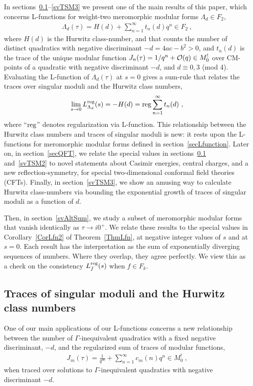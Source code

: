 \documentclass[11pt,a4paper]{article}
\newcommand{\G}{\Gamma}
\newcommand{\reg}{{\rm reg}}
\begin{document}
In sections~\ref{svTSM1}--\ref{svTSM3} we present one of the main results of this paper, which concerns L-functions for weight-two meromorphic modular forms $\Lambda_d \in F_2$,
\begin{align}
\Lambda_d(\tau) = H(d) + \sum_{n = 1}^{\infty} t_n(d) q^n \in F_2~, \label{s3e1}
\end{align}
where $H(d)$ is the Hurwitz class-number, and that counts the number of distinct quadratics with negative discriminant $-d = 4ac - b^2 > 0$, and $t_n(d)$ is the trace of the unique modular function $J_n(\tau) = 1/q^n + {\cal O}(q) \in M_0^{!}$ over CM-points of a quadratic with negative discriminant $-d$, and $d \equiv 0, 3$ (mod 4). Evaluating the L-function of $\Lambda_d(\tau)$ at $s = 0$ gives a sum-rule that relates the traces over singular moduli and the Hurwitz class numbers,
\begin{align}
\lim_{s \to 0} L_{\Lambda_d}^\reg(s) = -H(d) = \reg\sum_{n =1}^{\infty} t_n(d)~,\label{s3e2}
\end{align}
where ``$\reg$'' denotes regularization via L-function. This relationship between the Hurwitz class numbers and traces of singular moduli is new: it rests upon the L-functions for meromorphic modular forms defined in section~\ref{secLfunction}. Later on, in section~\ref{secQFT}, we relate the special values in sections~\ref{svTSM1} and~\ref{svTSM2} to novel statements about Casimir energies, central charges, and a new reflection-symmetry, for special two-dimensional conformal field theories (CFTs). Finally, in section~\ref{svTSM3}, we show an amusing way to calculate Hurwitz class-numbers via bounding the exponential growth of traces of singular moduli as a function of $d$.  

Then, in section~\ref{svAltSum}, we study a subset of meromorphic modular forms that vanish identically as $\tau \to i 0^+$. We relate these results to the special values in Corollary~\ref{CorLfn2} of Theorem~\ref{ThmLfn}, at negative integer values of $s$ and at $s = 0$. Each result has the interpretation as the sum of exponentially diverging sequences of numbers. Where they overlap, they agree perfectly. We view this as a check on the consistency $L_f^\reg(s)$ when $f \in F_k$.

\subsection{Traces of singular moduli and the Hurwitz class numbers}\label{svTSM1}

One of our main applications of our L-functions concerns a new relationship between the number of $\G$-inequivalent quadratics with a fixed negative discriminant, $-d$, and the regularized sum of traces of modular functions,
\begin{align}
J_m(\tau) = \frac{1}{q^m} + \sum_{n = 1}^{\infty} c_m(n) q^n \in M_0^{!} ~, \label{eqJm}
\end{align}
when traced over solutions to $\G$-inequivalent quadratics with negative discriminant $-d$. 
\end{document}
